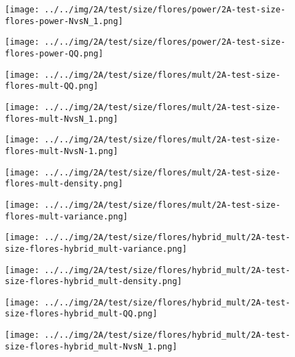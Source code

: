 \begin{figure}[H]
\centering	\texttt{[image: ../../img/2A/test/size/flores/power/2A-test-size-flores-power-NvsN\_1.png]}
\end{figure}
\begin{figure}[H]
\centering	\texttt{[image: ../../img/2A/test/size/flores/power/2A-test-size-flores-power-QQ.png]}
\end{figure}
\begin{figure}[H]
\centering	\texttt{[image: ../../img/2A/test/size/flores/mult/2A-test-size-flores-mult-QQ.png]}
\end{figure}
\begin{figure}[H]
\centering	\texttt{[image: ../../img/2A/test/size/flores/mult/2A-test-size-flores-mult-NvsN\_1.png]}
\end{figure}
\begin{figure}[H]
\centering	\texttt{[image: ../../img/2A/test/size/flores/mult/2A-test-size-flores-mult-NvsN-1.png]}
\end{figure}
\begin{figure}[H]
\centering	\texttt{[image: ../../img/2A/test/size/flores/mult/2A-test-size-flores-mult-density.png]}
\end{figure}
\begin{figure}[H]
\centering	\texttt{[image: ../../img/2A/test/size/flores/mult/2A-test-size-flores-mult-variance.png]}
\end{figure}
\begin{figure}[H]
\centering	\texttt{[image: ../../img/2A/test/size/flores/hybrid\_mult/2A-test-size-flores-hybrid\_mult-variance.png]}
\end{figure}
\begin{figure}[H]
\centering	\texttt{[image: ../../img/2A/test/size/flores/hybrid\_mult/2A-test-size-flores-hybrid\_mult-density.png]}
\end{figure}
\begin{figure}[H]
\centering	\texttt{[image: ../../img/2A/test/size/flores/hybrid\_mult/2A-test-size-flores-hybrid\_mult-QQ.png]}
\end{figure}
\begin{figure}[H]
\centering	\texttt{[image: ../../img/2A/test/size/flores/hybrid\_mult/2A-test-size-flores-hybrid\_mult-NvsN\_1.png]}
\end{figure}
